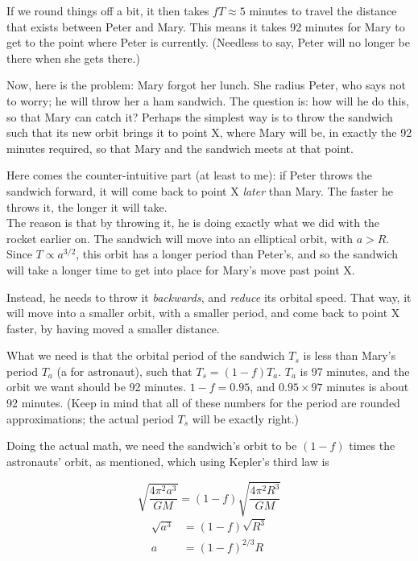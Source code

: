 If we round things off a bit, it then takes $f T \approx 5$ minutes to travel the distance that exists between Peter and Mary. This means it takes 92 minutes for Mary to get to the point where Peter is currently. (Needless to say, Peter will no longer be there when she gets there.)

Now, here is the problem: Mary forgot her lunch. She radius Peter, who says not to worry; he will throw her a ham sandwich. The question is: how will he do this, so that Mary can catch it? Perhaps the simplest way is to throw the sandwich such that its new orbit brings it to point X, where Mary will be, in exactly the 92 minutes required, so that Mary and the sandwich meets at that point.

Here comes the counter-intuitive part (at least to me): if Peter throws the sandwich forward, it will come back to point X \emph{later} than Mary. The faster he throws it, the longer it will take.\\
The reason is that by throwing it, he is doing exactly what we did with the rocket earlier on. The sandwich will move into an elliptical orbit, with $a > R$. Since $T \propto a^{3/2}$, this orbit has a longer period than Peter's, and so the sandwich will take a longer time to get into place for Mary's move past point X.

Instead, he needs to throw it \emph{backwards}, and \emph{reduce} its orbital speed. That way, it will move into a smaller orbit, with a smaller period, and come back to point X faster, by having moved a smaller distance.

What we need is that the orbital period of the sandwich $T_s$ is less than Mary's period $T_a$ (a for astronaut), such that $T_s = (1 - f) T_a$. $T_a$ is 97 minutes, and the orbit we want should be 92 minutes. $1 - f = 0.95$, and $0.95 \times 97$ minutes is about 92 minutes. (Keep in mind that all of these numbers for the period are rounded approximations; the actual period $T_s$ will be exactly right.)

Doing the actual math, we need the sandwich's orbit to be $(1-f)$ times the astronauts' orbit, as mentioned, which using Kepler's third law is

\begin{equation}
\sqrt{\frac{4 \pi^2 a^3}{G M}} = (1-f) \sqrt{\frac{4 \pi^2 R^3}{G M}}
\end{equation}
\begin{align}
\sqrt{a^3} &= (1-f) \sqrt{R^3}\\
a &= (1-f)^{2/3} R
\end{align}


